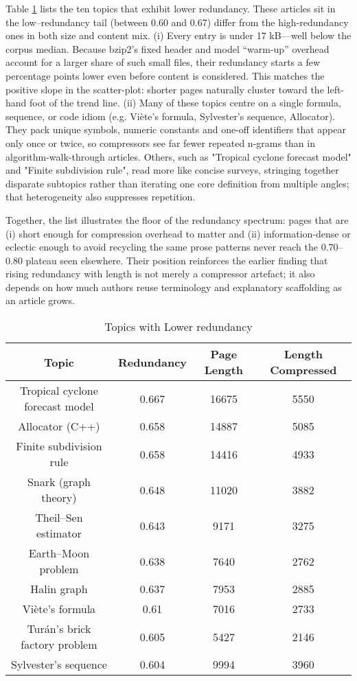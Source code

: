 Table \ref{tab:Lower-redundancy-of-topics} lists the ten topics that exhibit lower redundancy. These articles sit in the low–redundancy tail (between 0.60 and 0.67) differ from the high-redundancy ones in both size and content mix. (i)  Every entry is under 17 kB—well below the corpus median. Because bzip2’s fixed header and model “warm-up” overhead account for a larger share of such small files, their redundancy starts a few percentage points lower even before content is considered. This matches the positive slope in the scatter-plot: shorter pages naturally cluster toward the left-hand foot of the trend line. (ii) Many of these topics centre on a single formula, sequence, or code idiom (e.g. Viète’s formula, Sylvester’s sequence, Allocator). They pack unique symbols, numeric constants and one-off identifiers that appear only once or twice, so compressors see far fewer repeated n-grams than in algorithm-walk-through articles. Others, such as "Tropical cyclone forecast model" and "Finite subdivision rule", read more like concise surveys, stringing together disparate subtopics rather than iterating one core definition from multiple angles; that heterogeneity also suppresses repetition.

Together, the list illustrates the floor of the redundancy spectrum: pages that are (i) short enough for compression overhead to matter and (ii) information-dense or eclectic enough to avoid recycling the same prose patterns never reach the 0.70–0.80 plateau seen elsewhere.  Their position reinforces the earlier finding that rising redundancy with length is not merely a compressor artefact; it also depends on how much authors reuse terminology and explanatory scaffolding as an article grows.

\begin{table}
\begin{centering}
\begin{tabular}{|c|c|c|c|}
\hline 
Topic & Redundancy & Page Length & Length Compressed \tabularnewline
\hline 
\hline 
Tropical cyclone forecast model & 0.667 & 16675 & 5550 \tabularnewline
\hline
Allocator (C++) & 0.658 & 14887 & 5085 \tabularnewline
\hline
Finite subdivision rule & 0.658 & 14416 & 4933 \tabularnewline
\hline
Snark (graph theory) & 0.648 & 11020 & 3882 \tabularnewline
\hline
Theil–Sen estimator & 0.643 & 9171 & 3275 \tabularnewline
\hline
Earth–Moon problem & 0.638 & 7640 & 2762 \tabularnewline
\hline
Halin graph & 0.637 & 7953 & 2885 \tabularnewline
\hline
Viète's formula & 0.61 & 7016 & 2733 \tabularnewline
\hline
Turán's brick factory problem & 0.605 & 5427 & 2146 \tabularnewline
\hline
Sylvester's sequence & 0.604 & 9994 & 3960 \tabularnewline
\hline 
\end{tabular}
\par\end{centering}
\caption{\label{tab:Lower-redundancy-of-topics}Topics with Lower redundancy}
\end{table}

